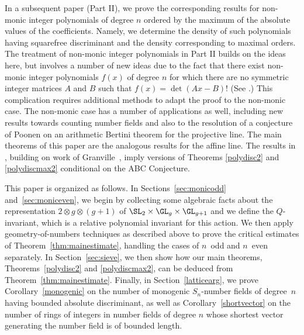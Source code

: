 In a subsequent paper \cite{SqSieve2} (Part II), we prove the
corresponding results for non-monic integer polynomials of degree $n$
ordered by the maximum of the absolute values of the coefficients.
Namely, we determine the density of such polynomials
having squarefree discriminant and the density corresponding to maximal orders. The
treatment of non-monic integer polynomials in Part II builds on the
ideas here, but involves a number of new ideas due to the fact that
there exist non-monic integer polynomials $f(x)$ of degree $n$ for
which there are no symmetric integer matrices $A$ and $B$ such that
$f(x) = \det(Ax-B)$!  (See \cite{BGWhyper}.)  This
complication requires additional methods to adapt the proof to the
non-monic case.  The non-monic case has a number of applications as
well, including new results towards counting number fields and also to
the resolution of a conjecture of Poonen \cite{PBertini} on an
arithmetic Bertini theorem for the projective line. The main
theorems of this paper are the analogous results for the affine
line. The results in \cite{PBertini}, building on work of
Granville~\cite{Gabc}, imply versions of Theorems \ref{polydisc2} and
\ref{polydiscmax2} conditional on the ABC Conjecture.


This paper is organized as follows. In Sections~\ref{sec:monicodd} and~\ref{sec:moniceven}, we begin by
collecting some algebraic facts about the representation $2\otimes
g\otimes(g+1)$ of $\SL_2\times\GL_g\times\GL_{g+1}$ and we define the
$Q$-invariant, which is a relative polynomial invariant for this
action.  We
then apply geometry-of-numbers techniques as described above to prove
the critical estimates of Theorem~\ref{thm:mainestimate}, handling the cases of $n$~odd and $n$~even separately. In
Section~\ref{sec:sieve}, we then show how our main theorems, Theorems~\ref{polydisc2} and \ref{polydiscmax2}, can be deduced from
Theorem~\ref{thm:mainestimate}.  Finally, in Section~\ref{latticearg},
we prove Corollary~\ref{monogenic} on the number of monogenic
$S_n$-number fields of degree~$n$ having bounded absolute
discriminant, as well as Corollary~\ref{shortvector} on the number of
rings of integers in number fields of degree $n$ whose shortest vector
generating the number field is of bounded length.
